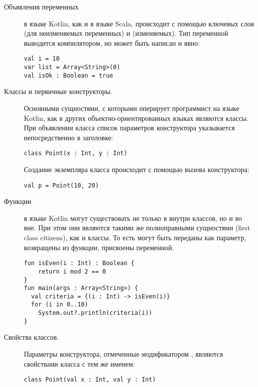 \begin{description}
\item[Объявления переменных] в языке Kotlin, как и в языке Scala, происходит с помощью ключевых слов  (для неизменяемых переменных)
и  (изменяемых). Тип переменной выводится компилятором, но может быть написан и явно:
\begin{code}\begin{lstlisting}
val i = 10
var list = Array<String>(0)
val isOk : Boolean = true
\end{lstlisting}\end{code}
	\item[Классы и первичные конструкторы.] Основными сущностями, с которыми оперирует программист на языке Kotlin, как в других объектно-ориентированных языках являются классы. При объявлении класса список параметров конструктора указывается непосредственно в заголовке:
\begin{code}\begin{lstlisting}
class Point(x : Int, y : Int)
\end{lstlisting}\end{code}
	Создание экземпляра класса происходит с помощью вызова конструктора:
\begin{code}\begin{lstlisting}
val p = Point(10, 20)
\end{lstlisting}\end{code}
	\item[Функции] в языке Kotlin могут существовать не только в внутри классов, но и во вне. При этом они являются такими же полноправными сущностями (first class citizens), как и классы. То есть могут быть переданы как параметр, возвращены из функции, присвоены переменной.
\begin{code}\begin{lstlisting}
fun isEven(i : Int) : Boolean {
    return i mod 2 == 0
}
fun main(args : Array<String>) {
  val criteria = {(i : Int) -> isEven(i)}
  for (i in 0..10)
    System.out?.println(criteria(i))
}
\end{lstlisting}\end{code}
	\item[Свойства классов.] Параметры конструктора, отмеченные модификатором , являются свойствами класса с тем же именем:
\begin{code}\begin{lstlisting}
class Point(val x : Int, val y : Int)


\end{lstlisting}
\end{code}
\end{description}
